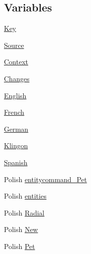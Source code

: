 \subsection*{Variables}
\begin{DoxyCompactItemize}
\item 
\mbox{\hyperlink{_blooms_01_animal_01_husbandry_2_config_2_localization_8txt_ab3c7af4820830f9166ede9e5623c4e73}{Key}}
\item 
\mbox{\hyperlink{_blooms_01_animal_01_husbandry_2_config_2_localization_8txt_a176e1eca2d1e3d1c6a064340bc6a351e}{Source}}
\item 
\mbox{\hyperlink{_blooms_01_animal_01_husbandry_2_config_2_localization_8txt_abbebfae2c8b3c06e3115e79965277840}{Context}}
\item 
\mbox{\hyperlink{_blooms_01_animal_01_husbandry_2_config_2_localization_8txt_aada75e543d2eadaa69533d17cac8bd9a}{Changes}}
\item 
\mbox{\hyperlink{_blooms_01_animal_01_husbandry_2_config_2_localization_8txt_ad896b63205779b1b09e86d941ce13976}{English}}
\item 
\mbox{\hyperlink{_blooms_01_animal_01_husbandry_2_config_2_localization_8txt_addddcf918bce70f82d5d59902a7e3fba}{French}}
\item 
\mbox{\hyperlink{_blooms_01_animal_01_husbandry_2_config_2_localization_8txt_a18bff3d9892c435006ca22f43a9f031f}{German}}
\item 
\mbox{\hyperlink{_blooms_01_animal_01_husbandry_2_config_2_localization_8txt_ae413412a6184b4aa46db8a189cad08d9}{Klingon}}
\item 
\mbox{\hyperlink{_blooms_01_animal_01_husbandry_2_config_2_localization_8txt_a1a2fba2f516cad50ef94b146902a8336}{Spanish}}
\item 
Polish \mbox{\hyperlink{_blooms_01_animal_01_husbandry_2_config_2_localization_8txt_a60467b0275f4d137dd8af94959a5758a}{entitycommand\+\_\+\+Pet}}
\item 
Polish \mbox{\hyperlink{_blooms_01_animal_01_husbandry_2_config_2_localization_8txt_af2c5d8ef92d9813da6e6610532caf7c1}{entities}}
\item 
Polish \mbox{\hyperlink{_blooms_01_animal_01_husbandry_2_config_2_localization_8txt_a572fddd3d55e8bcf216db04fa3e992dd}{Radial}}
\item 
Polish \mbox{\hyperlink{_blooms_01_animal_01_husbandry_2_config_2_localization_8txt_a8a16fa076ec2c405996c2039f397a8a6}{New}}
\item 
Polish \mbox{\hyperlink{_blooms_01_animal_01_husbandry_2_config_2_localization_8txt_a8c30e07ea775697a74d9093d8bc7c695}{Pet}}

\end{DoxyCompactItemize}
